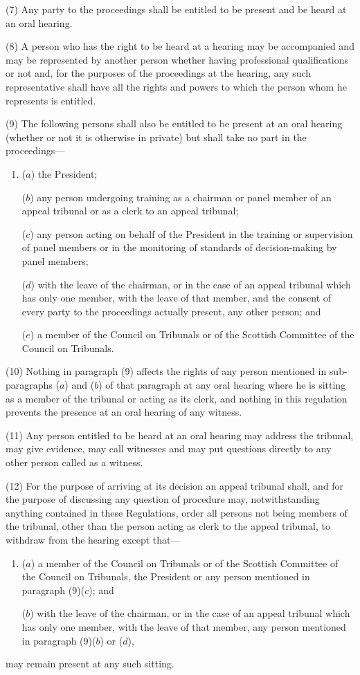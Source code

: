 \documentclass[12pt,a4paper]{article}
\begin{document}
(7) Any party to the proceedings shall be entitled to be present and be heard at an oral hearing.

(8) A person who has the right to be heard at a hearing may be accompanied and may be represented by another person whether having professional qualifications or not and, for the purposes of the proceedings at the hearing, any such representative shall have all the rights and powers to which the person whom he represents is entitled.

(9) The following persons shall also be entitled to be present at an oral hearing (whether or not it is otherwise in private) but shall take no part in the proceedings—
\begin{enumerate}\item[]
($a$) the President;

($b$) any person undergoing training as a chairman or panel member of an appeal tribunal or as a clerk to an appeal tribunal;

($c$) any person acting on behalf of the President in the training or supervision of panel members or in the monitoring of standards of decision-making by panel members;

($d$) with the leave of the chairman, or in the case of an appeal tribunal which has only one member, with the leave of that member, and the consent of every party to the proceedings actually present, any other person; and

($e$) a member of the Council on Tribunals or of the Scottish Committee of the Council on Tribunals.
\end{enumerate}

(10) Nothing in paragraph (9) affects the rights of any person mentioned in sub-paragraphs ($a$) and ($b$) of that paragraph at any oral hearing where he is sitting as a member of the tribunal or acting as its clerk, and nothing in this regulation prevents the presence at an oral hearing of any witness.

(11) Any person entitled to be heard at an oral hearing may address the tribunal, may give evidence, may call witnesses and may put questions directly to any other person called as a witness.

(12) For the purpose of arriving at its decision an appeal tribunal shall, and for the purpose of discussing any question of procedure may, notwithstanding anything contained in these Regulations, order all persons not being members of the tribunal, other than the person acting as clerk to the appeal tribunal, to withdraw from the hearing except that—
\begin{enumerate}\item[]
($a$) a member of the Council on Tribunals or of the Scottish Committee of the Council on Tribunals, the President or any person mentioned in paragraph (9)($c$); and

($b$) with the leave of the chairman, or in the case of an appeal tribunal which has only one member, with the leave of that member, any person mentioned in paragraph (9)($b$) or ($d$),
\end{enumerate}
may remain present at any such sitting.
\end{document}
